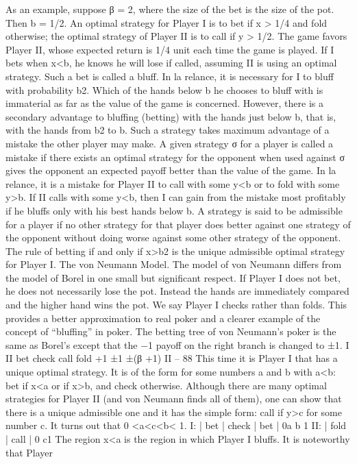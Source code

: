 As an example, suppose β = 2, where the size of the bet is the size of the pot. Then
b = 1/2. An optimal strategy for Player I is to bet if x > 1/4 and fold otherwise; the
optimal strategy of Player II is to call if y > 1/2. The game favors Player II, whose
expected return is 1/4 unit each time the game is played.
If I bets when x<b, he knows he will lose if called, assuming II is using an optimal
strategy. Such a bet is called a bluff. In la relance, it is necessary for I to bluff with
probability b2. Which of the hands below b he chooses to bluff with is immaterial as far as
the value of the game is concerned. However, there is a secondary advantage to bluffing
(betting) with the hands just below b, that is, with the hands from b2 to b. Such a strategy
takes maximum advantage of a mistake the other player may make.
A given strategy σ for a player is called a mistake if there exists an optimal strategy
for the opponent when used against σ gives the opponent an expected payoff better than
the value of the game. In la relance, it is a mistake for Player II to call with some y<b
or to fold with some y>b. If II calls with some y<b, then I can gain from the mistake
most profitably if he bluffs only with his best hands below b.
A strategy is said to be admissible for a player if no other strategy for that player
does better against one strategy of the opponent without doing worse against some other
strategy of the opponent. The rule of betting if and only if x>b2 is the unique admissible
optimal strategy for Player I.
The von Neumann Model. The model of von Neumann differs from the model of
Borel in one small but significant respect. If Player I does not bet, he does not necessarily
lose the pot. Instead the hands are immediately compared and the higher hand wins the
pot. We say Player I checks rather than folds. This provides a better approximation to
real poker and a clearer example of the concept of “bluffing” in poker. The betting tree of
von Neumann’s poker is the same as Borel’s except that the −1 payoff on the right branch
is changed to ±1.
I
II
bet check
call fold
+1
±1
±(β +1)
II – 88
This time it is Player I that has a unique optimal strategy. It is of the form for some
numbers a and b with a<b: bet if x<a or if x>b, and check otherwise. Although there
are many optimal strategies for Player II (and von Neumann finds all of them), one can
show that there is a unique admissible one and it has the simple form: call if y>c for
some number c. It turns out that 0 <a<c<b< 1.
I: | bet | check | bet |
0a b 1
II: | fold | call |
0 c1
The region x<a is the region in which Player I bluffs. It is noteworthy that Player
